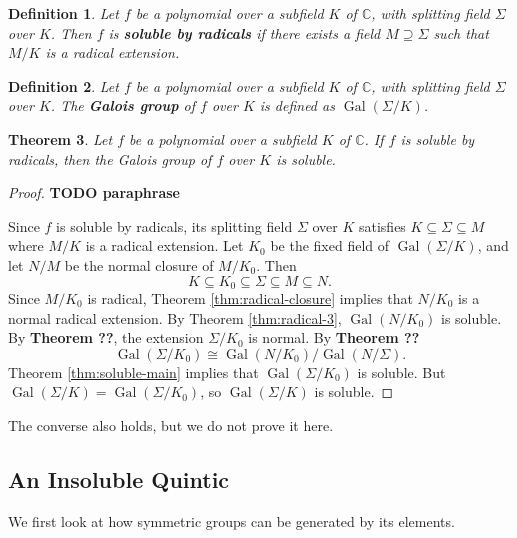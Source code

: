 \documentclass[12pt]{article}
\newtheorem{theorem}{Theorem}
\newtheorem{definition}[theorem]{Definition}
\newcommand{\Gal}{\operatorname{Gal}}
\begin{document}
\begin{definition}
    Let $f$ be a polynomial over a subfield $K$ of $\mathbb{C}$, with splitting field $\Sigma$ over $K$. Then $f$ is \textbf{soluble by radicals} if there exists a field $M \supseteq \Sigma$ such that $M / K$ is a radical extension.  
\end{definition}


\begin{definition}
    Let $f$ be a polynomial over a subfield $K$ of $\mathbb{C}$, with splitting field $\Sigma$ over $K$. The \textbf{Galois group} of $f$ over $K$ is defined as $\Gal(\Sigma / K)$.
\end{definition}

\begin{theorem} \label{thm:radical-galois-soluble}
    Let $f$ be a polynomial over a subfield $K$ of $\mathbb{C}$. If $f$ is soluble by radicals, then the Galois group of $f$ over $K$ is soluble.
\end{theorem}

\begin{proof}
\textbf{TODO paraphrase}

Since $f$ is soluble by radicals, its splitting field $\Sigma$ over $K$ satisfies $K \subseteq \Sigma \subseteq M$ where $M / K$ is a radical extension. Let $K_0$ be the fixed field of $\Gal(\Sigma / K)$, and let $N / M$ be the normal closure of $M / K_0$. Then
$$
K \subseteq K_0 \subseteq \Sigma \subseteq M \subseteq N.
$$
Since $M / K_0$ is radical, Theorem \ref{thm:radical-closure} implies that $N / K_0$ is a normal radical extension. By Theorem \ref{thm:radical-3}, $\Gal\left(N / K_0\right)$ is soluble.
By \textbf{Theorem ??}, the extension $\Sigma / K_0$ is normal. By \textbf{Theorem ??}
$$
\Gal\left(\Sigma / K_0\right) \cong \Gal\left(N / K_0\right) / \Gal(N / \Sigma).
$$
Theorem \ref{thm:soluble-main} implies that $\Gal\left(\Sigma / K_0\right)$ is soluble. But $\Gal(\Sigma / K)=\Gal\left(\Sigma / K_0\right)$, so $\Gal(\Sigma / K)$ is soluble.

\end{proof}

The converse also holds, but we do not prove it here.

\subsection{An Insoluble Quintic}
We first look at how symmetric groups can be generated by its elements. 
\end{document}
